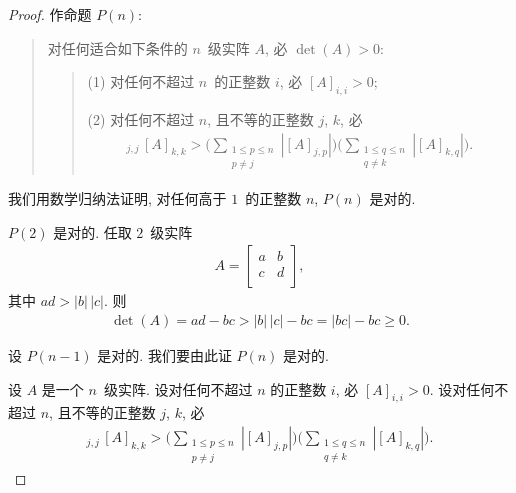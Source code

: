 \begin{proof}
    作命题 \(P(n)\):
    \begin{quotation}
        对任何适合如下条件的 \(n\)~级实阵 \(A\),
        必 \(\det {(A)} > 0\):
        \begin{quotation}
            (1)
            对任何不超过 \(n\)~的正整数 \(i\),
            必 \([A]_{i,i} > 0\);

            (2)
            对任何不超过 \(n\), 且不等的正整数 \(j\), \(k\), 必
            \begin{align*}
                [A]_{j,j}\,[A]_{k,k} >
                \Bigg(
                \sum_{\substack{1 \leq p \leq n \\
                        p \neq j}} {|[A]_{j,p}|}
                \Bigg)
                \Bigg(
                \sum_{\substack{1 \leq q \leq n \\
                        q \neq k}} {|[A]_{k,q}|}
                \Bigg).
            \end{align*}
        \end{quotation}
    \end{quotation}
    我们用数学归纳法证明,
    对任何高于 \(1\)~的正整数 \(n\),
    \(P(n)\) 是对的.

    \(P(2)\) 是对的.
    任取 \(2\)~级实阵
    \begin{align*}
        A = \begin{bmatrix}
                a & b \\
                c & d \\
            \end{bmatrix},
    \end{align*}
    其中 \(a d > |b|\,|c|\).
    则
    \begin{align*}
        \det {(A)} = ad - bc > |b|\,|c| - bc
        = |bc| - bc \geq 0.
    \end{align*}

    设 \(P(n-1)\) 是对的.
    我们要由此证 \(P(n)\) 是对的.

    设 \(A\) 是一个 \(n\)~级实阵.
    设对任何不超过 \(n\) 的正整数 \(i\), 必
    \([A]_{i,i} > 0\).
    设对任何不超过 \(n\), 且不等的正整数 \(j\), \(k\), 必
    \begin{align*}
        [A]_{j,j}\,[A]_{k,k} >
        \Bigg(
        \sum_{\substack{1 \leq p \leq n \\
                p \neq j}} {|[A]_{j,p}|}
        \Bigg)
        \Bigg(
        \sum_{\substack{1 \leq q \leq n \\
                q \neq k}} {|[A]_{k,q}|}
        \Bigg).
    \end{align*}


\end{proof}
